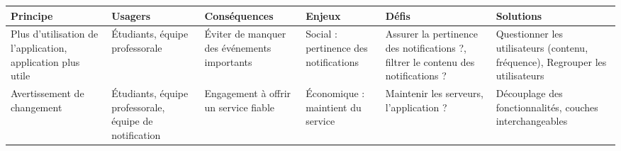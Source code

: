 \begin{tabular}{P{0.15\textwidth}P{0.15\textwidth}P{0.15\textwidth}P{0.15\textwidth}P{0.15\textwidth}P{0.15\textwidth}}
	\hline
	\bf Principe & \bf Usagers & \bf Conséquences & \bf Enjeux & \bf Défis & \bf Solutions \\
	\hline
	\hline
	Plus d'utilisation de l'application, application plus utile
	& Étudiants, équipe professorale
	& Éviter de manquer des événements importants
	& Social : pertinence des notifications
	& Assurer la pertinence des notifications ?, filtrer le contenu des notifications ?
	& Questionner les utilisateurs (contenu, fréquence), Regrouper les utilisateurs
	\\
	Avertissement de changement
	& Étudiants, équipe professorale, équipe de notification
	& Engagement à offrir un service fiable
	& Économique : maintient du service
	& Maintenir les serveurs, l'application ?
	& Découplage des fonctionnalités, couches interchangeables 
	\\
	
	\hline
\end{tabular}